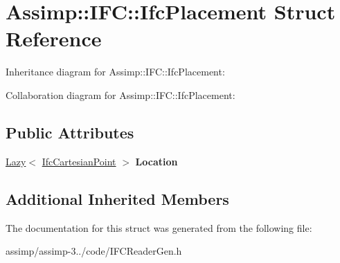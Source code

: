 \hypertarget{struct_assimp_1_1_i_f_c_1_1_ifc_placement}{\section{Assimp\+:\+:I\+F\+C\+:\+:Ifc\+Placement Struct Reference}
\label{struct_assimp_1_1_i_f_c_1_1_ifc_placement}
}


Inheritance diagram for Assimp\+:\+:I\+F\+C\+:\+:Ifc\+Placement\+:


Collaboration diagram for Assimp\+:\+:I\+F\+C\+:\+:Ifc\+Placement\+:
\subsection*{Public Attributes}
\begin{DoxyCompactItemize}
\item 
\hypertarget{struct_assimp_1_1_i_f_c_1_1_ifc_placement_a26dde67b8d549f010f7dc7e381e31d37}{\hyperlink{struct_assimp_1_1_s_t_e_p_1_1_lazy}{Lazy}$<$ \hyperlink{struct_assimp_1_1_i_f_c_1_1_ifc_cartesian_point}{Ifc\+Cartesian\+Point} $>$ {\bfseries Location}}\label{struct_assimp_1_1_i_f_c_1_1_ifc_placement_a26dde67b8d549f010f7dc7e381e31d37}

\end{DoxyCompactItemize}
\subsection*{Additional Inherited Members}


The documentation for this struct was generated from the following file\+:\begin{DoxyCompactItemize}
\item 
assimp/assimp-\/3../code/I\+F\+C\+Reader\+Gen.\+h\end{DoxyCompactItemize}
